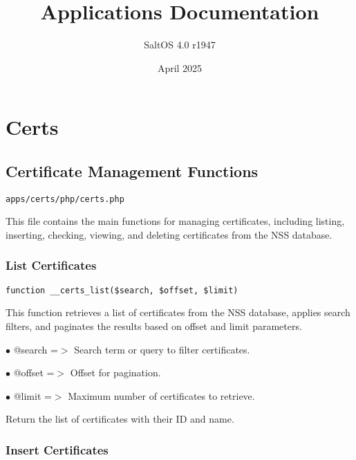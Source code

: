 \documentclass[a4paper]{article}
\title{Applications Documentation}
\author{SaltOS 4.0 r1947}
\begin{document}
\date{April 2025}
\maketitle
\clearpage

\tableofcontents
\clearpage


\hypertarget{toc1}{}
\section{Certs}

\hypertarget{toc2}{}
\subsection{Certificate Management Functions}

\begin{lstlisting}
apps/certs/php/certs.php
\end{lstlisting}

This file contains the main functions for managing certificates, including listing,
inserting, checking, viewing, and deleting certificates from the NSS database.

\hypertarget{toc3}{}
\subsubsection{List Certificates}

\begin{lstlisting}
function __certs_list($search, $offset, $limit)
\end{lstlisting}

This function retrieves a list of certificates from the NSS database, applies search filters,
and paginates the results based on offset and limit parameters.

\begin{compactitem}
\item[\color{myblue}$\bullet$] @search =$>$ Search term or query to filter certificates.
\item[\color{myblue}$\bullet$] @offset =$>$ Offset for pagination.
\item[\color{myblue}$\bullet$] @limit  =$>$ Maximum number of certificates to retrieve.
\end{compactitem}

Return the list of certificates with their ID and name.

\hypertarget{toc4}{}
\subsubsection{Insert Certificates}
\end{document}
